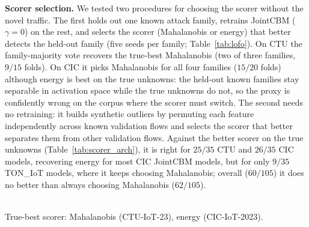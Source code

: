 \documentclass[journal]{IEEEtran}
\begin{document}
\textbf{Scorer selection.} We tested two procedures for choosing the scorer without the novel traffic. The first holds out one known attack family, retrains JointCBM ($\gamma{=}0$) on the rest, and selects the scorer (Mahalanobis or energy) that better detects the held-out family (five seeds per family; Table~\ref{tab:lofo}). On CTU the family-majority vote recovers the true-best Mahalanobis (two of three families, $9/15$ folds). On CIC it picks Mahalanobis for all four families ($15/20$ folds) although energy is best on the true unknowns: the held-out known families stay separable in activation space while the true unknowns do not, so the proxy is confidently wrong on the corpus where the scorer must switch. The second needs no retraining: it builds synthetic outliers by permuting each feature independently across known validation flows and selects the scorer that better separates them from other validation flows. Against the better scorer on the true unknowns (Table~\ref{tab:scorer_arch}), it is right for $25/35$ CTU and $26/35$ CIC models, recovering energy for most CIC JointCBM models, but for only $9/35$ TON\_IoT models, where it keeps choosing Mahalanobis; overall ($60/105$) it does no better than always choosing Mahalanobis ($62/105$).

\begin{table}[t]
\centering\small
\caption{Leave-family-out scorer selection (JointCBM $\gamma{=}0$, five seeds per
held-out family). AUROCs are five-seed means; ``Winner'' counts the runs selecting
Mahalanobis\,/\,energy on the held-out family, so it can disagree with the means.}
\label{tab:lofo}
\setlength{\tabcolsep}{5pt}
\\[2pt]
{\footnotesize True-best scorer: Mahalanobis (CTU-IoT-23), energy (CIC-IoT-2023).}
\end{table}
\end{document}
